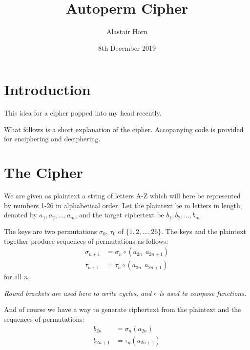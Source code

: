 \documentclass{article}
\title{Autoperm Cipher}
\date{8th December 2019}
\author{Alastair Horn}
\begin{document}
\maketitle

\section*{Introduction}

This idea for a cipher popped into my head recently.

What follows is a short explanation of the cipher.
Accopanying code is provided for enciphering and deciphering.

\section*{The Cipher}

We are given as plaintext a string of letters A-Z
which will here be represented by numbers 1-26 in
alphabetical order. Let the plaintext be $m$ letters in length,
denoted by $a_1, a_2, \ldots, a_m$,
and the target ciphertext be $b_1, b_2, \ldots, b_m$.

The keys are two permutations $\sigma_0$, $\tau_0$ of
$\{1, 2, \ldots, 26\}$. The keys and the plaintext together produce
sequences of permutations as follows:
\begin{align*}
\sigma_{n+1} &= \sigma_n \circ (a_{2n} \ \ a_{2n+1}) \\
\tau_{n+1} &= \tau_n \circ (a_{2n} \ \ a_{2n+1})
\end{align*}
for all $n$.

\textit{Round brackets are used here to write cycles,
and $\circ$ is used to compose functions.}

And of course we have a way to generate ciphertext from the
plaintext and the sequences of permutations:
\begin{align*}
b_{2n} &= \sigma_n(a_{2n}) \\
b_{2n+1} &= \tau_n (a_{2n+1})
\end{align*}
\end{document}
